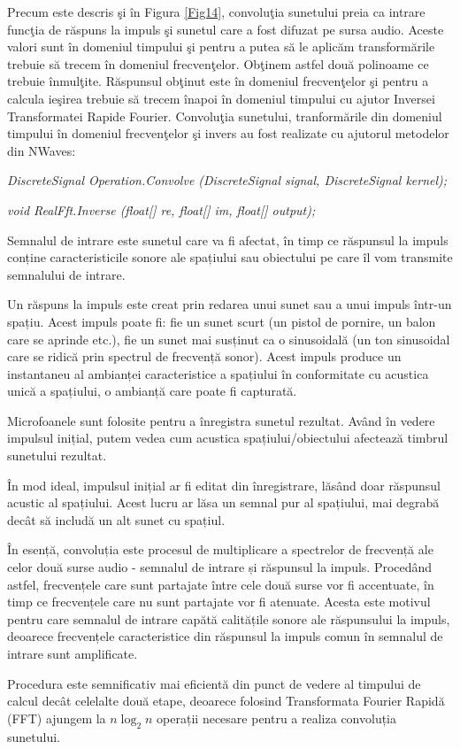 	Precum este descris \c{s}i \^{i}n Figura \ref{Fig14}, convolu\c{t}ia sunetului preia ca intrare func\c{t}ia de r\u{a}spuns la impuls \c{s}i sunetul care a fost difuzat pe sursa audio. Aceste valori sunt \^{i}n domeniul timpului \c{s}i pentru a putea s\u{a} le aplic\u{a}m transform\u{a}rile trebuie s\u{a} trecem \^{i}n domeniul frecven\c{t}elor. Ob\c{t}inem astfel dou\u{a} polinoame ce trebuie \^{i}nmul\c{t}ite. R\u{a}spunsul ob\c{t}inut este \^{i}n domeniul frecven\c{t}elor \c{s}i pentru a calcula ie\c{s}irea trebuie s\u{a} trecem \^{i}napoi \^{i}n domeniul timpului cu ajutor Inversei Transformatei Rapide Fourier. Convolu\c{t}ia sunetului, tranform\u{a}rile din domeniul timpului \^{i}n domeniul frecven\c{t}elor \c{s}i invers au fost realizate cu ajutorul metodelor din NWaves: 
	
	\begin{itemize}
		\utb \textit{DiscreteSignal Operation.Convolve (DiscreteSignal signal, DiscreteSignal kernel);}
		
		\utb \textit{void RealFft.Inverse (float[] re, float[] im, float[] output);}
		
	\end{itemize}

	Semnalul de intrare este sunetul care va fi afectat, în timp ce răspunsul la impuls conține caracteristicile sonore ale spațiului sau obiectului pe care îl vom transmite semnalului de intrare.
	
	Un răspuns la impuls este creat prin redarea unui sunet sau a unui impuls într-un spațiu. Acest impuls poate fi: fie un sunet scurt (un pistol de pornire, un balon care se aprinde etc.), fie un sunet mai susținut ca o sinusoidală (un ton sinusoidal care se ridică prin spectrul de frecvență sonor). Acest impuls produce un instantaneu al ambianței caracteristice a spațiului în conformitate cu acustica unică a spațiului, o ambianță care poate fi capturată.
	
	Microfoanele sunt folosite pentru a înregistra sunetul rezultat. Având în vedere impulsul inițial, putem vedea cum acustica spațiului/obiectului afectează timbrul sunetului rezultat.
	
	În mod ideal, impulsul inițial ar fi editat din înregistrare, lăsând doar răspunsul acustic al spațiului. Acest lucru ar lăsa un semnal pur al spațiului, mai degrabă decât să includă un alt sunet cu spațiul.
	
	În esență, convoluția este procesul de multiplicare a spectrelor de frecvență ale celor două surse audio - semnalul de intrare și răspunsul la impuls. Procedând astfel, frecvențele care sunt partajate între cele două surse vor fi accentuate, în timp ce frecvențele care nu sunt partajate vor fi atenuate. Acesta este motivul pentru care semnalul de intrare capătă calitățile sonore ale răspunsului la impuls, deoarece frecvențele caracteristice din răspunsul la impuls comun în semnalul de intrare sunt amplificate.

	Procedura este semnificativ mai eficientă din punct de vedere al timpului de calcul decât celelalte două etape, deoarece folosind Transformata Fourier Rapidă (FFT) ajungem la $n\log_2n$ operații necesare pentru a realiza convoluția sunetului.